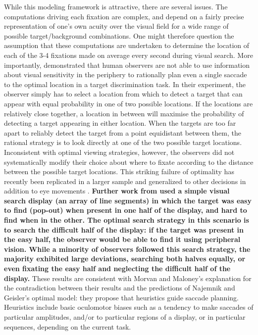 While this modeling framework is attractive, there are several issues. The computations driving each fixation are complex, and depend on a fairly precise representation of one's own acuity over the visual field for a wide range of possible target/background combinations. One might therefore question the assumption that these computations are undertaken to determine the location of each of the 3-4 fixations made on average every second during visual search. More importantly,  \cite{morvan-maloney2012} demonstrated that human observers are not able to use information about visual sensitivity in the periphery to rationally plan even a single saccade to the optimal location in a target discrimination task. In their experiment, the observer simply has to select a location from which to detect a target that can appear with equal probability in one of two possible locations. If the locations are relatively close together, a location in between will maximise the probability of detecting a target appearing in either location. When the targets are too far apart to reliably detect the target from a point equidistant between them, the rational strategy is to look directly at one of the two possible target locations. Inconsistent with optimal viewing strategies, however, the observers did not systematically modify their choice about where to fixate according to the distance between the possible target locations. This striking failure of optimality has recently been replicated in a larger sample and generalized to other decisions in addition to eye movements \citep{clarke-hunt2015}. \textbf{Further work from \cite{nowakowska2017} used a simple visual search display (an array of line segments) in which the target was easy to find (pop-out) when present in one half of the display, and hard to find when in the other. The optimal search strategy in this scenario is to search the difficult half of the display: if the target was present in the easy half, the observer would be able to find it using peripheral vision. While a minority of observers followed this search strategy, the majority exhibited large deviations, searching both halves equally, or even fixating the easy half and neglecting the difficult half of the display.} These results are consistent with Morvan and Maloney’s explanation for the contradiction between their results and the predictions of Najemnik and Geisler’s optimal model: they propose that heuristics guide saccade planning. Heuristics include basic oculomotor biases such as a tendency to make saccades of particular amplitudes, and/or to particular regions of a display, or in particular sequences, depending on the current task. 

